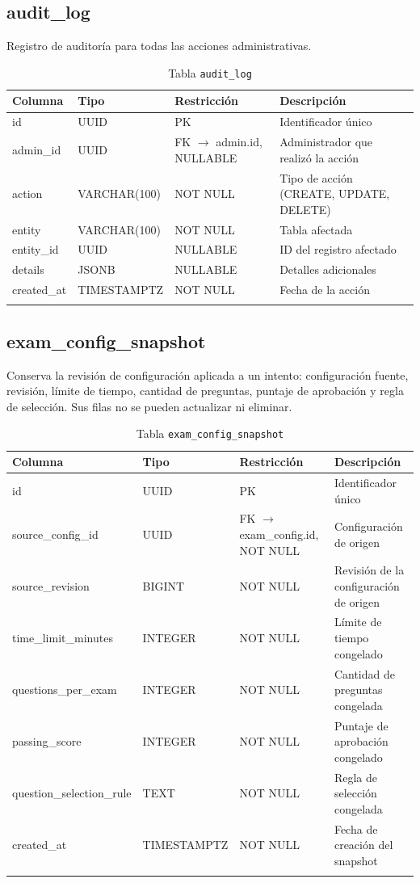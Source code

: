 \newpage

\subsection{audit\_log}

Registro de auditoría para todas las acciones administrativas.

\begin{longtable}{l l l p{5cm}}
\toprule
\textbf{Columna} & \textbf{Tipo} & \textbf{Restricción} & \textbf{Descripción} \\
\midrule
\endhead
id & UUID & PK & Identificador único \\
admin\_id & UUID & FK $\rightarrow$ admin.id, NULLABLE & Administrador que realizó la acción \\
action & VARCHAR(100) & NOT NULL & Tipo de acción (CREATE, UPDATE, DELETE) \\
entity & VARCHAR(100) & NOT NULL & Tabla afectada \\
entity\_id & UUID & NULLABLE & ID del registro afectado \\
details & JSONB & NULLABLE & Detalles adicionales \\
created\_at & TIMESTAMPTZ & NOT NULL & Fecha de la acción \\
\bottomrule
\caption{Tabla \texttt{audit\_log}}
\end{longtable}

\subsection{exam\_config\_snapshot}

Conserva la revisión de configuración aplicada a un intento: configuración fuente, revisión, límite de tiempo, cantidad de preguntas, puntaje de aprobación y regla de selección. Sus filas no se pueden actualizar ni eliminar.

\begin{longtable}{l l l p{5cm}}
\toprule
\textbf{Columna} & \textbf{Tipo} & \textbf{Restricción} & \textbf{Descripción} \\
\midrule
\endhead
id & UUID & PK & Identificador único \\
source\_config\_id & UUID & FK $\rightarrow$ exam\_config.id, NOT NULL & Configuración de origen \\
source\_revision & BIGINT & NOT NULL & Revisión de la configuración de origen \\
time\_limit\_minutes & INTEGER & NOT NULL & Límite de tiempo congelado \\
questions\_per\_exam & INTEGER & NOT NULL & Cantidad de preguntas congelada \\
passing\_score & INTEGER & NOT NULL & Puntaje de aprobación congelado \\
question\_selection\_rule & TEXT & NOT NULL & Regla de selección congelada \\
created\_at & TIMESTAMPTZ & NOT NULL & Fecha de creación del snapshot \\
\bottomrule
\caption{Tabla \texttt{exam\_config\_snapshot}}
\end{longtable}

